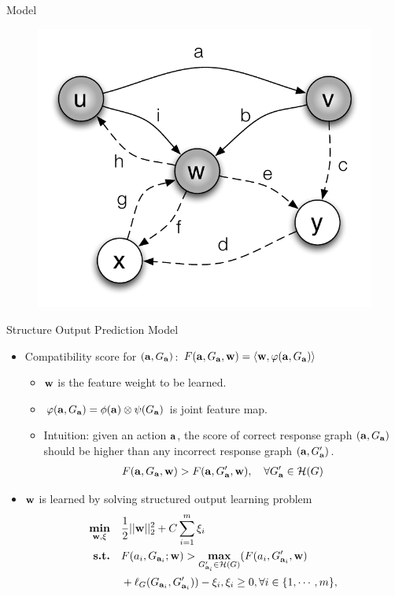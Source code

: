 \documentclass[first=dgreen,second=purple,logo=yellowexc]{aaltoslides}
\newcommand{\ip}[2]{\langle #1, #2 \rangle}
\newcommand{\Hcal}{\mathcal{H}} %
\newcommand{\maximize}{\textbf{max}}
\newcommand{\wb}{{\bf w}}
\newcommand{\ab}{{\bf a}}
\newcommand{\minimize}{\textbf{min}}
\begin{document}
\begin{frame}{Model}
\begin{multicols}{2}
	\begin{figure}
		\includegraphics[scale=0.25]{./plots/propagation_example.pdf}
	\end{figure}
	\end{multicols}
\end{frame}

\begin{frame}{Structure Output Prediction Model}
	\begin{itemize}
		\item Compatibility score for $(\ab,G_{\ab})$: $F(\ab,G_{\ab},\wb) = \ip{\wb}{\varphi(\ab,G_{\ab})}$
			\begin{itemize}
				\item $\wb$ is the feature weight to be learned.
				\item $\varphi(\ab,G_{\ab})=\phi(\ab)\otimes\psi(G_{\ab})$ is joint feature map.
				\item Intuition: given an action $\ab$, the score of correct response graph $(\ab,G_{\ab})$ should be higher than any incorrect response graph $(\ab,G_{\ab}')$.
				\begin{align*}
					F(\ab,G_{\ab},\wb)>F(\ab,G_{\ab}',\wb), \quad \forall G_{\ab}'\in\Hcal(G)
				\end{align*}
			\end{itemize}
		\item $\wb$ is learned by solving structured output learning problem
		\begin{align*}
			\underset{\wb,\xi}{\minimize} &\quad \frac{1}{2}||\wb||^2_2+C\sum_{i=1}^{m}\xi_i \\
			\textbf{s.t.} &\quad F(a_i,G_{\ab_i};\wb) > \underset{G_{\ab_i}'\in\Hcal(G)}{\maximize} (F(a_i,G_{\ab_i}',\wb)\\
			&\quad +\ell_G(G_{\ab_i},G_{\ab_i}'))-\xi_i, \xi_i\ge 0,\forall i\in\{1,\cdots,m\},
		\end{align*}
	\end{itemize}
\end{frame}
\end{document}
